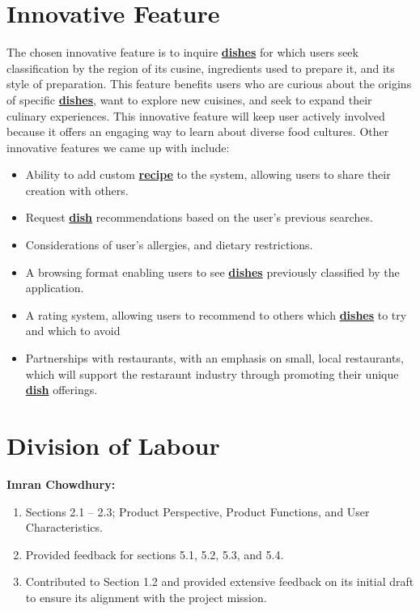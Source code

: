 \documentclass[]{article}
\begin{document}


\section{Innovative Feature}

The chosen innovative feature is to inquire \hyperref[Dish]{\textbf{dishes}} for which users seek classification by the region of its cusine, ingredients used to prepare it, and its style of preparation. 
This feature benefits users who are curious about the origins of specific \hyperref[Dish]{\textbf{dishes}}, want to explore new cuisines, and seek to expand their culinary experiences.
This innovative feature will keep user actively involved because it offers an engaging way to learn about diverse food cultures.
Other innovative features we came up with include:

\begin{itemize}
	\item Ability to add custom \hyperref[Recipe]{\textbf{recipe}} to the system, allowing users to share their creation with others.
	\item Request \hyperref[Dish]{\textbf{dish}} recommendations based on the user's previous searches.
	\item Considerations of user's allergies, and dietary restrictions.
	\item A browsing format enabling users to see \hyperref[Dish]{\textbf{dishes}} previously classified by the application.
	\item A rating system, allowing users to recommend to others which \hyperref[Dish]{\textbf{dishes}} to try and which to avoid
	\item Partnerships with restaurants, with an emphasis on small, local restaurants, which will support the restaraunt industry
	through promoting their unique \hyperref[Dish]{\textbf{dish}} offerings.
\end{itemize}

\appendix
\section{Division of Labour}
\label{sec:division_of_labour}

\textbf{Imran Chowdhury:}
\begin{enumerate}
	\item Sections 2.1 -- 2.3; Product Perspective, Product Functions, and User Characteristics.
	\item Provided feedback for sections 5.1, 5.2, 5.3, and 5.4.
	\item Contributed to Section 1.2 and provided extensive feedback on its initial draft to ensure its alignment with the project mission.
\end{enumerate}
\end{document}
